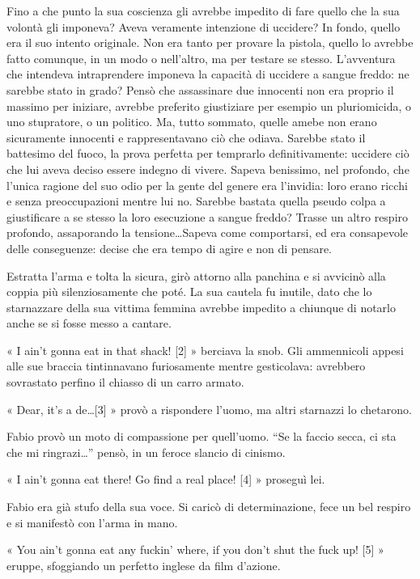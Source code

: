 Fino a che punto la sua coscienza gli avrebbe impedito di fare quello che la sua volontà gli imponeva? Aveva veramente intenzione di uccidere? In fondo, quello era il suo intento originale. Non era tanto per provare la pistola, quello lo avrebbe fatto comunque, in un modo o nell'altro, ma per testare se stesso. L'avventura che intendeva intraprendere imponeva la capacità di uccidere a sangue freddo: ne sarebbe stato in grado? Pensò che assassinare due innocenti non era proprio il massimo per iniziare, avrebbe preferito giustiziare per esempio un pluriomicida, o uno stupratore, o un politico. Ma, tutto sommato, quelle amebe non erano sicuramente innocenti e rappresentavano ciò che odiava. Sarebbe stato il battesimo del fuoco, la prova perfetta per temprarlo definitivamente: uccidere ciò che lui aveva deciso essere indegno di vivere. Sapeva benissimo, nel profondo, che l'unica ragione del suo odio per la gente del genere era l'invidia: loro erano ricchi e senza preoccupazioni mentre lui no. Sarebbe bastata quella pseudo colpa a giustificare a se stesso la loro esecuzione a sangue freddo? Trasse un altro respiro profondo, assaporando la tensione\ldots Sapeva come comportarsi, ed era consapevole delle conseguenze: decise che era tempo di agire e non di pensare.

Estratta l'arma e tolta la sicura, girò attorno alla panchina e si avvicinò alla coppia più silenziosamente che poté. La sua cautela fu inutile, dato che lo starnazzare della sua vittima femmina avrebbe impedito a chiunque di notarlo anche se si fosse messo a cantare.

« I ain't gonna eat in that shack! [2] » berciava la snob. Gli ammennicoli appesi alle sue braccia tintinnavano furiosamente mentre gesticolava: avrebbero sovrastato perfino il chiasso di un carro armato.

« Dear, it's a de\ldots [3] » provò a rispondere l'uomo, ma altri starnazzi lo chetarono.

Fabio provò un moto di compassione per quell'uomo. ``Se la faccio secca, ci sta che mi ringrazi\ldots'' pensò, in un feroce slancio di cinismo.

« I ain't gonna eat there! Go find a real place! [4] » proseguì lei.

Fabio era già stufo della sua voce. Si caricò di determinazione, fece un bel respiro e si manifestò con l'arma in mano.

« You ain't gonna eat any fuckin' where, if you don't shut the fuck up! [5] » eruppe, sfoggiando un perfetto inglese da film d'azione.

